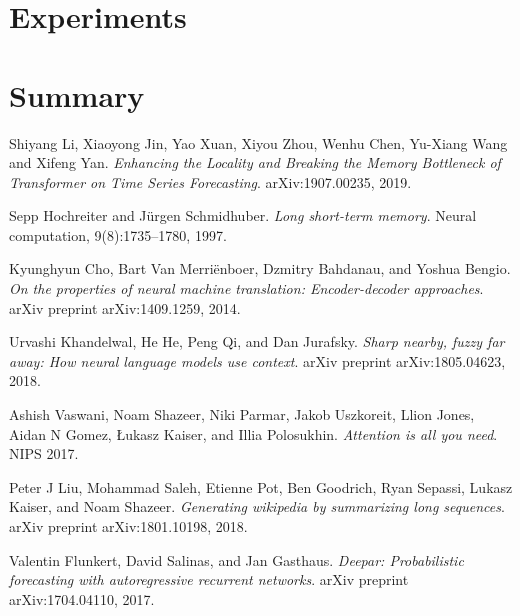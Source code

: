 \documentclass[en]{pracamgr}
\begin{document}
\chapter{Experiments}

\chapter{Summary}





\begin{thebibliography}{99}

%


%
 Shiyang Li, Xiaoyong Jin, Yao Xuan, Xiyou Zhou, Wenhu Chen, Yu-Xiang Wang and Xifeng Yan. \textit{Enhancing the Locality and Breaking the Memory
	Bottleneck of Transformer on Time Series Forecasting}. arXiv:1907.00235, 2019.

 Sepp Hochreiter and Jürgen Schmidhuber. \textit{Long short-term memory}. Neural computation, 9(8):1735–1780, 1997.

 Kyunghyun Cho, Bart Van Merriënboer, Dzmitry Bahdanau, and Yoshua Bengio. \textit{On the properties of neural machine translation: Encoder-decoder approaches}. arXiv preprint arXiv:1409.1259, 2014.

 Urvashi Khandelwal, He He, Peng Qi, and Dan Jurafsky. \textit{Sharp nearby, fuzzy far away: How neural language models use context}. arXiv preprint arXiv:1805.04623, 2018.

 Ashish Vaswani, Noam Shazeer, Niki Parmar, Jakob Uszkoreit, Llion Jones, Aidan N Gomez, Łukasz
Kaiser, and Illia Polosukhin. \textit{Attention is all you need}. NIPS 2017.

 Peter J Liu, Mohammad Saleh, Etienne Pot, Ben Goodrich, Ryan Sepassi, Lukasz Kaiser, and Noam
Shazeer. \textit{Generating wikipedia by summarizing long sequences}. arXiv preprint arXiv:1801.10198, 2018.

 Valentin Flunkert, David Salinas, and Jan Gasthaus. \textit{Deepar: Probabilistic forecasting with autoregressive recurrent networks}. arXiv preprint arXiv:1704.04110, 2017.


\end{thebibliography}
\end{document}
